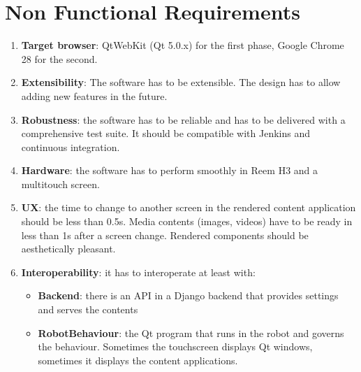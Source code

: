 \section{Non Functional Requirements}
\begin{enumerate}
    \item \textbf{Target browser}: QtWebKit (Qt 5.0.x) for the first phase, Google Chrome 28 for the second.
    \item \textbf{Extensibility}: The software has to be extensible. The design has to allow adding new features in the future.
    \item \textbf{Robustness}: the software has to be reliable and has to be delivered with a comprehensive test suite. It should be compatible with Jenkins and continuous integration.
    \item \textbf{Hardware}: the software has to perform smoothly in Reem H3 and a multitouch screen.
    \item \textbf{\ac{UX}}: the time to change to another screen in the rendered content application should be less than 0.5s. Media contents (images, videos) have to be ready in less than 1s after a screen change. Rendered components should be aesthetically pleasant.
    \item \textbf{Interoperability}: it has to interoperate at least with:
    \begin{itemize}
        \item \textbf{Backend}: there is an \ac{API} in a Django backend that provides settings and serves the contents
        \item \textbf{RobotBehaviour}: the Qt program that runs in the robot and governs the behaviour. Sometimes the touchscreen displays Qt windows, sometimes it displays the content applications. 
    \end{itemize}
\end{enumerate}